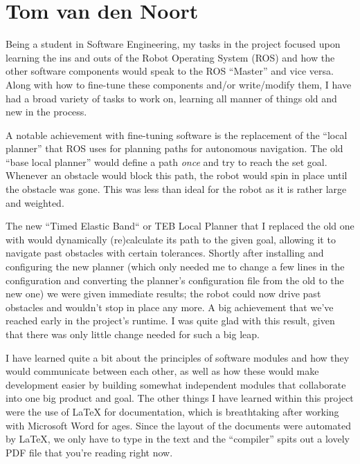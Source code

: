 \section{Tom van den Noort}

Being a student in Software Engineering, my tasks in the project focused upon learning the ins and outs of the Robot Operating System (ROS) and how the other software components would speak to the ROS ``Master'' and vice versa. Along with how to fine-tune these components and/or write/modify them, I have had a broad variety of tasks to work on, learning all manner of things old and new in the process.

\vspace{5mm}

A notable achievement with fine-tuning software is the replacement of the ``local planner'' that ROS uses for planning paths for autonomous navigation. The old ``base local planner'' would define a path \textit{once} and try to reach the set goal. Whenever an obstacle would block this path, the robot would spin in place until the obstacle was gone. This was less than ideal for the robot as it is rather large and weighted.

The new ``Timed Elastic Band`` or TEB Local Planner that I replaced the old one with would dynamically (re)calculate its path to the given goal, allowing it to navigate past obstacles with certain tolerances. Shortly after installing and configuring the new planner (which only needed me to change a few lines in the configuration and converting the planner's configuration file from the old to the new one) we were given immediate results; the robot could now drive past obstacles and wouldn't stop in place any more. A big achievement that we've reached early in the project's runtime. I was quite glad with this result, given that there was only little change needed for such a big leap.

\vspace{5mm}

I have learned quite a bit about the principles of software modules and how they would communicate between each other, as well as how these would make development easier by building somewhat independent modules that collaborate into one big product and goal. 
The other things I have learned within this project were the use of LaTeX for documentation, which is breathtaking after working with Microsoft Word for ages. Since the layout of the documents were automated by LaTeX, we only have to type in the text and the ``compiler'' spits out a lovely PDF file that you're reading right now.

